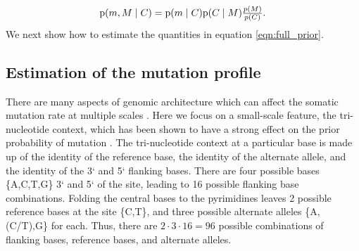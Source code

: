 \documentclass[a4,center,fleqn]{NAR}
\begin{document}
\begin{equation}
  \label{eqn:full_prior}
  $$
  \mathrm{p}(m,M \mid C) = \mathrm{p}(m \mid C) \mathrm{p}(C \mid M)\frac{p(M)}{p(C)}.
  $$
\end{equation}
We next show how to estimate the quantities in equation \ref{eqn:full_prior}.

\subsection{Estimation of the mutation profile}
There are many aspects of genomic architecture which can affect the somatic mutation rate at multiple scales \cite{Buisson2019}.
Here we focus on a small-scale feature, the tri-nucleotide context, which has been shown to have a strong effect on the prior probability of mutation \citep{Nik-Zainal2012a,Alexandrov2015,Lee-Six2018}.
The tri-nucleotide context at a particular base is made up of the identity of the reference base, the identity of the alternate allele, and the identity of the 3` and 5` flanking bases.
There are four possible bases {\{A,C,T,G\}} 3` and 5` of the site, leading to 16 possible flanking base combinations.
Folding the central bases to the pyrimidines leaves 2 possible reference bases at the site {\{C,T\}}, and three possible alternate alleles {\{A,(C/T),G\}} for each.
Thus, there are $2 \cdot 3 \cdot 16 = 96$ possible combinations of flanking bases, reference bases, and alternate alleles. 
\end{document}
